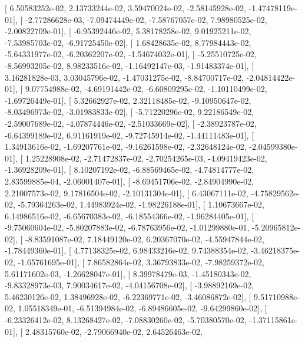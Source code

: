 \documentclass{article}
\begin{document}
       [  6.50583252e-02,   2.13733244e-02,   3.59470024e-02,
         -2.58145928e-02,  -1.47478119e-01],
       [ -2.77286628e-03,  -7.09474449e-02,  -7.58767057e-02,
          7.98980525e-02,  -2.00822709e-01],
       [ -6.95392446e-02,   5.38178258e-02,   9.01925211e-02,
         -7.53985703e-02,  -6.91725450e-02],
       [  1.68428635e-02,   8.77984443e-02,  -5.64331977e-02,
         -6.20362207e-02,  -1.54674032e-01],
       [ -5.25510725e-02,  -8.56993205e-02,   8.98233516e-02,
         -1.16492147e-03,  -1.91483374e-01],
       [  3.16281828e-03,   3.03045796e-02,  -1.47031275e-02,
         -8.84700717e-02,  -2.04814422e-01],
       [  9.07754988e-02,  -4.69191442e-02,  -6.60809295e-02,
         -1.10110499e-02,  -1.69726449e-01],
       [  5.32662927e-02,   2.32118485e-02,  -9.10950647e-02,
         -8.03496973e-02,  -3.01983833e-02],
       [ -5.71220296e-02,   9.22186549e-02,  -2.59007689e-02,
         -4.07874446e-02,  -2.51033669e-02],
       [ -2.38923787e-02,  -6.64399189e-02,   6.91161919e-02,
         -9.72745914e-02,  -1.44111483e-01],
       [  1.34913616e-02,  -1.69207761e-02,  -9.16261598e-02,
         -2.32648124e-02,  -2.04599380e-01],
       [  1.25228908e-02,  -2.71472837e-02,  -2.70254265e-03,
         -4.09419423e-02,  -1.36928209e-01],
       [  8.10207192e-02,  -6.88569465e-02,  -4.74814777e-02,
          2.83599885e-04,  -2.06001407e-01],
       [ -8.69451706e-02,  -2.84904990e-02,   2.21007573e-02,
          9.17816504e-02,  -2.10131304e-01],
       [  6.43067111e-02,  -4.75829562e-02,  -5.79364263e-02,
          1.44983924e-02,  -1.98226188e-01],
       [  1.10673667e-02,   6.14986516e-02,  -6.65670383e-02,
         -6.18554366e-02,  -1.96284405e-01],
       [ -9.75060604e-02,  -5.80207883e-02,  -6.78763956e-02,
         -1.01299880e-01,  -5.20965812e-02],
       [ -8.83591087e-02,   7.18449120e-02,   6.20367070e-02,
         -4.55947844e-02,  -1.78449360e-01],
       [  4.77138325e-02,   6.98433216e-02,   9.74388354e-02,
         -3.46218375e-02,  -1.65761695e-01],
       [  7.86582864e-02,   3.36793833e-02,  -7.98259372e-02,
          5.61171602e-03,  -1.26628047e-01],
       [  8.39978479e-03,  -1.45180343e-02,  -9.83328973e-03,
          7.90034617e-02,  -4.04156708e-02],
       [ -3.98892169e-02,   5.46230126e-02,   1.38496928e-02,
         -6.22369771e-02,  -3.46086872e-02],
       [  9.51710988e-02,   1.05518349e-01,  -6.51394984e-02,
         -6.89486605e-02,  -9.64299860e-02],
       [ -6.23326412e-02,   8.13268427e-02,  -7.08830260e-02,
         -5.70380570e-02,  -1.37115861e-01],
       [  2.48315760e-02,  -2.79066940e-02,   2.64526463e-02,
\end{document}
